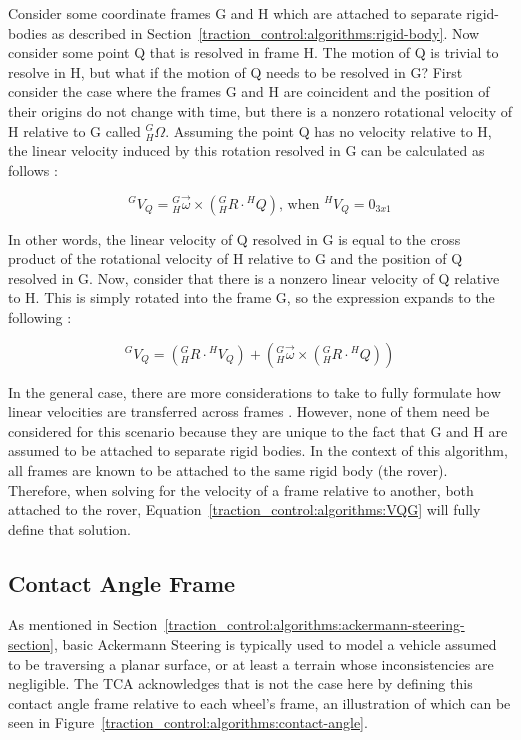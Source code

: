 Consider some coordinate frames G and H which are attached to separate rigid-bodies as described in Section~\ref{traction_control:algorithms:rigid-body}. Now consider some point Q that is resolved in frame H. The motion of Q is trivial to resolve in H, but what if the motion of Q needs to be resolved in G? First consider the case where the frames G and H are coincident and the position of their origins do not change with time, but there is a nonzero rotational velocity of H relative to G called ${}^{G}_{H}\Omega$. Assuming the point Q has no velocity relative to H, the linear velocity induced by this rotation resolved in G can be calculated as follows \cite{craig}:

\begin{equation}
	{}^{G}V_{Q} = {}^{G}_{H}\vec{\omega} \times \left({}^{G}_{H}R \cdot {}^{H}Q\right) \text{, when } {}^{H}V_{Q} = 0_{3x1}
\end{equation}

In other words, the linear velocity of Q resolved in G is equal to the cross product of the rotational velocity of H relative to G and the position of Q resolved in G. Now, consider that there is a nonzero linear velocity of Q relative to H. This is simply rotated into the frame G, so the expression expands to the following \cite{craig}:

\begin{equation}\label{traction_control:algorithms:VQG}
	{}^{G}V_{Q} = \left({}^{G}_{H}R \cdot {}^{H}V_{Q}\right) + \left({}^{G}_{H}\vec{\omega} \times \left({}^{G}_{H}R \cdot {}^{H}Q\right)\right)
\end{equation}

In the general case, there are more considerations to take to fully formulate how linear velocities are transferred across frames \cite{craig}. However, none of them need be considered for this scenario because they are unique to the fact that G and H are assumed to be attached to separate rigid bodies. In the context of this algorithm, all frames are known to be attached to the same rigid body (the rover). Therefore, when solving for the velocity of a frame relative to another, both attached to the rover, Equation~\ref{traction_control:algorithms:VQG} will fully define that solution.

\subsection{Contact Angle Frame}
As mentioned in Section~\ref{traction_control:algorithms:ackermann-steering-section}, basic Ackermann Steering is typically used to model a vehicle assumed to be traversing a planar surface, or at least a terrain whose inconsistencies are negligible. The \ac{TCA} acknowledges that is not the case here by defining this contact angle frame relative to each wheel's frame, an illustration of which can be seen in Figure~\ref{traction_control:algorithms:contact-angle}.

